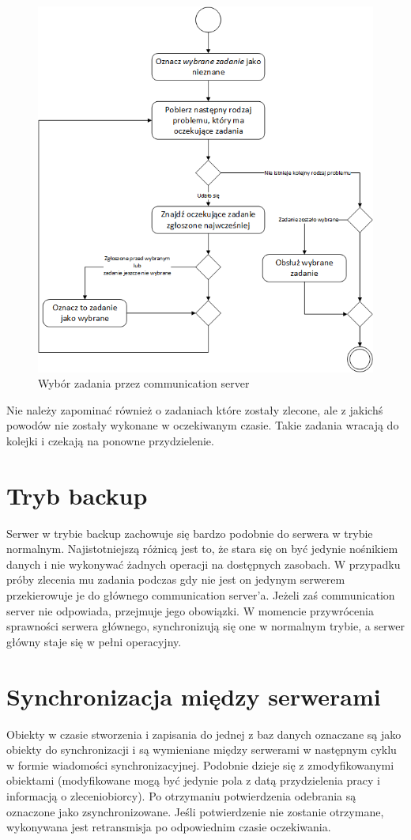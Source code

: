 \documentclass{report}
\begin{document}
	\begin{figure}[h]
		\centering
		\includegraphics[width=\textwidth]{img/CommunicationServer-SelectTask.png}
		\caption{Wybór zadania przez communication server}
	\end{figure}
	
	Nie należy zapominać również o zadaniach które zostały zlecone, ale z jakichś powodów
	nie zostały wykonane w oczekiwanym czasie. Takie zadania wracają do kolejki i czekają na
	ponowne przydzielenie.
	
\section{Tryb backup}
	Serwer w trybie backup zachowuje się bardzo podobnie do serwera w trybie normalnym.
	Najistotniejszą różnicą jest to, że stara się on być jedynie nośnikiem danych
	i nie wykonywać żadnych operacji na dostępnych zasobach. W przypadku próby zlecenia
	mu zadania podczas gdy nie jest on jedynym serwerem przekierowuje je do głównego communication server'a.
	Jeżeli zaś communication server nie odpowiada, przejmuje jego obowiązki.
	W momencie przywrócenia sprawności serwera głównego, synchronizują się one w normalnym
	trybie, a serwer główny staje się w pełni operacyjny.
	
\section{Synchronizacja między serwerami}
	Obiekty w czasie stworzenia i zapisania do jednej z baz danych oznaczane są jako obiekty
	do synchronizacji i są wymieniane między serwerami w następnym cyklu w formie wiadomości
	synchronizacyjnej. Podobnie dzieje się z zmodyfikowanymi obiektami (modyfikowane
	mogą być jedynie pola z datą przydzielenia pracy i informacją o zleceniobiorcy).
	Po otrzymaniu potwierdzenia odebrania są oznaczone jako zsynchronizowane. Jeśli
	potwierdzenie nie zostanie otrzymane, wykonywana jest retransmisja po odpowiednim
	czasie oczekiwania.
	
\end{document}
